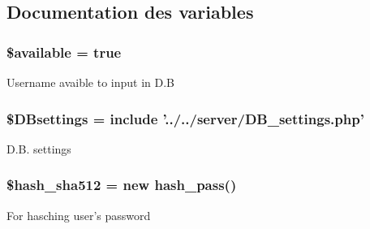 \subsection{Documentation des variables}
\hypertarget{_phpmyadmin_communication_8php_acbf7bb4d49f2f2ff4394b7cb4a4b98d0}{
\subsubsection[{\$available}]{\setlength{\rightskip}{0pt plus 5cm}\$available = true}}\label{_phpmyadmin_communication_8php_acbf7bb4d49f2f2ff4394b7cb4a4b98d0}
Username avaible to input in D.\-B \hypertarget{_phpmyadmin_communication_8php_a9d97b484ee351b8e6034d74504996e9f}{
\subsubsection[{\$\-D\-Bsettings}]{\setlength{\rightskip}{0pt plus 5cm}\$D\-Bsettings = include '../../server/D\-B\-\_\-settings.\-php'}}\label{_phpmyadmin_communication_8php_a9d97b484ee351b8e6034d74504996e9f}
D.\-B. settings \hypertarget{_phpmyadmin_communication_8php_a74c430dee86586ad77d12b88324d0837}{
\subsubsection[{\$hash\-\_\-sha512}]{\setlength{\rightskip}{0pt plus 5cm}\$hash\-\_\-sha512 = new {\bf hash\-\_\-pass}()}}\label{_phpmyadmin_communication_8php_a74c430dee86586ad77d12b88324d0837}
For hasching user's password 